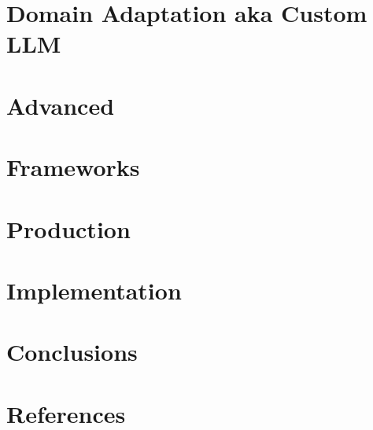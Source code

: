 \section[DA]{Domain Adaptation aka Custom LLM}


\section[Adv]{Advanced}


\section[Frm]{Frameworks}




\section[Prod]{Production}


\section[Impl]{Implementation}





\section[Concl]{Conclusions}


\section[Refs]{References}


